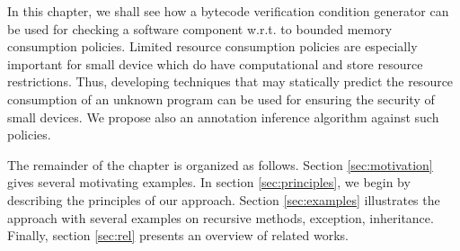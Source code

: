 In this chapter, we shall see how a bytecode verification condition generator can be used 
for checking a software component w.r.t. to bounded memory consumption policies.
Limited resource consumption policies are especially important for small device 
which do have computational and store resource restrictions. Thus, developing techniques  that may statically 
predict the resource consumption of an unknown program can be used for ensuring the security of small devices. 
We  propose also an annotation inference algorithm against such policies.


The remainder of the chapter is organized as follows. 
Section \ref{sec:motivation} gives several motivating examples.
In section \ref{sec:principles},  we begin by describing the principles of our
approach. Section \ref{sec:examples} illustrates the approach with several examples on recursive methods, exception, inheritance.
Finally, section \ref{sec:rel} presents an overview of related works.
